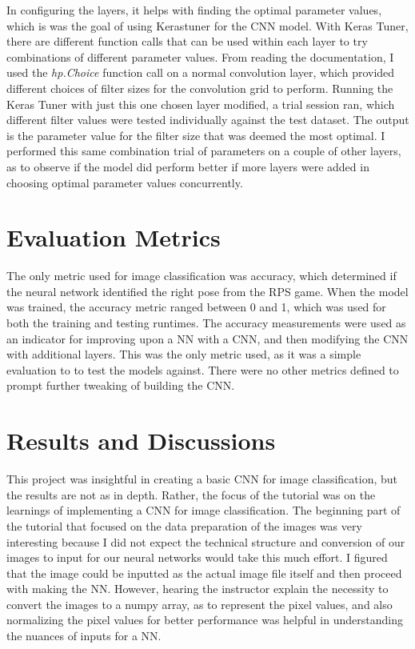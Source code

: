 \documentclass[10pt,twocolumn]{article}
\begin{document}
In configuring the layers, it helps with finding the optimal parameter values, which is was the goal of using Kerastuner for the CNN model. With Keras Tuner, there are different function calls that can be used within each layer to try combinations of different parameter values. From reading the documentation, I used the \textit{hp.Choice} function call on a normal convolution layer, which provided different choices of filter sizes for the convolution grid to perform. Running the Keras Tuner with just this one chosen layer modified, a trial session ran, which different filter values were tested individually against the test dataset. The output is the parameter value for the filter size that was deemed the most optimal. I performed this same combination trial of parameters on a couple of other layers, as to observe if the model did perform better if more layers were added in choosing optimal parameter values concurrently.

\section{Evaluation Metrics}
The only metric used for image classification was accuracy, which determined if the neural network identified the right pose from the RPS game. When the model was trained, the accuracy metric ranged between 0 and 1, which was used for both the training and testing runtimes. The accuracy measurements were used as an indicator for improving upon a NN with a CNN, and then modifying the CNN with additional layers. This was the only metric used, as it was a simple evaluation to to test the models against. There were no other metrics defined to prompt further tweaking of building the CNN.

\section{Results and Discussions}
This project was insightful in creating a basic CNN for image classification, but the results are not as in depth. Rather, the focus of the tutorial was on the learnings of implementing a CNN for image classification. The beginning part of the tutorial that focused on the data preparation of the images was very interesting because I did not expect the technical structure and conversion of our images to input for our neural networks would take this much effort. I figured that the image could be inputted as the actual image file itself and then proceed with making the NN. However, hearing the instructor explain the necessity to convert the images to a numpy array, as to represent the pixel values, and also normalizing the pixel values for better performance was helpful in understanding the nuances of inputs for a NN.
\end{document}
